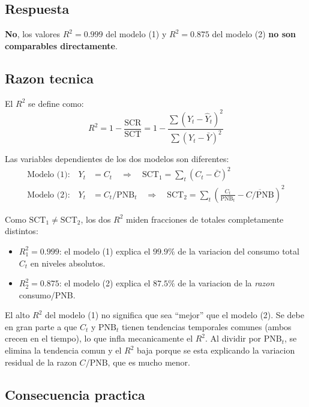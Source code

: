 \documentclass[12pt, letterpaper]{article}
\theoremstyle{remark}
\begin{document}
\subsection{Respuesta}

\textbf{No}, los valores $R^2 = 0.999$ del modelo (1) y $R^2 = 0.875$ del
modelo (2) \textbf{no son comparables directamente}.

\subsection{Razon tecnica}

El $R^2$ se define como:
\begin{equation}
  R^2 = 1 - \frac{\text{SCR}}{\text{SCT}}
      = 1 - \frac{\sum(Y_t - \hat Y_t)^2}{\sum(Y_t - \bar Y)^2}
  \label{eq:R2}
\end{equation}

Las variables dependientes de los dos modelos son diferentes:
\begin{align}
  \text{Modelo (1):} \quad Y_t &= C_t
    \quad \Rightarrow \quad
    \text{SCT}_1 = \sum_t (C_t - \bar C)^2
  \label{eq:SCT1}\\[4pt]
  \text{Modelo (2):} \quad Y_t &= C_t/\text{PNB}_t
    \quad \Rightarrow \quad
    \text{SCT}_2 = \sum_t \!\left(\frac{C_t}{\text{PNB}_t} - \overline{C/\text{PNB}}\right)^{\!2}
  \label{eq:SCT2}
\end{align}

Como $\text{SCT}_1 \neq \text{SCT}_2$, los dos $R^2$ miden fracciones de
totales completamente distintos:

\begin{itemize}[leftmargin=1.6em, itemsep=4pt]
  \item $R^2_1 = 0.999$: el modelo (1) explica el $99.9\%$ de la variacion
    del consumo total $C_t$ en niveles absolutos.
  \item $R^2_2 = 0.875$: el modelo (2) explica el $87.5\%$ de la variacion
    de la \emph{razon} consumo/PNB.
\end{itemize}

El alto $R^2$ del modelo (1) no significa que sea ``mejor'' que el modelo (2).
Se debe en gran parte a que $C_t$ y $\text{PNB}_t$ tienen tendencias temporales
comunes (ambos crecen en el tiempo), lo que infla mecanicamente el $R^2$. Al
dividir por $\text{PNB}_t$, se elimina la tendencia comun y el $R^2$ baja porque
se esta explicando la variacion residual de la razon $C/\text{PNB}$, que es
mucho menor.

\subsection{Consecuencia practica}
\end{document}
